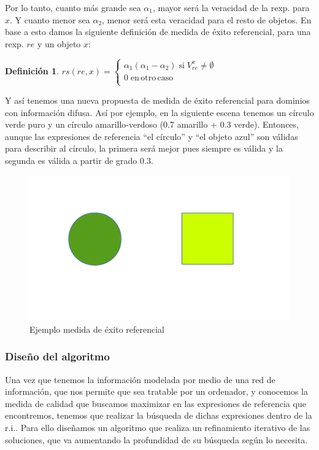 \documentclass[10pt,a4paper]{article}
\newtheorem{definicion}{Definición}
\begin{document}
Por lo tanto, cuanto más grande sea $\alpha_1$, mayor será la veracidad de la rexp. para $x$. Y cuanto menor sea $\alpha_2$, menor será esta veracidad para el resto de objetos. En base a esto damos la siguiente definición de medida de éxito referencial, para una rexp. $re$ y un objeto $x$:

\begin{definicion}
\label{def: medida}
$rs(re, x) = \left\lbrace 
\begin{array}{ll}
      \alpha_1(\alpha_1 - \alpha_2) \; \mathrm{si} \; V_{re}^x \neq \emptyset\\      
      0 \; \mathrm{en \, otro \, caso}\\
\end{array} \right.$
\end{definicion}

Y así tenemos una nueva propuesta de medida de éxito referencial para dominios con información difusa. Así por ejemplo, en la siguiente escena tenemos un círculo verde puro y un círculo amarillo-verdoso (0.7 amarillo + 0.3 verde). Entonces, aunque las expresiones de referencia ``el círculo'' y ``el objeto azul'' son válidas para describir al círculo, la primera será mejor pues siempre es válida y la segunda es válida a partir de grado 0.3.

\begin{figure}[h]
\centering
\includegraphics[scale=0.3]{img/ejemploMedidaBondad.png}
\caption{Ejemplo medida de éxito referencial}
\end{figure}

\subsubsection{Diseño del algoritmo}

Una vez que tenemos la información modelada por medio de una red de información, que nos permite que sea tratable por un ordenador, y conocemos la medida de calidad que buscamos maximizar en las expresiones de referencia que encontremos, tenemos que realizar la búsqueda de dichas expresiones dentro de la r.i.. Para ello diseñamos un algoritmo que realiza un refinamiento iterativo de las soluciones, que va aumentando la profundidad de su búsqueda según lo necesita.\\
\end{document}
